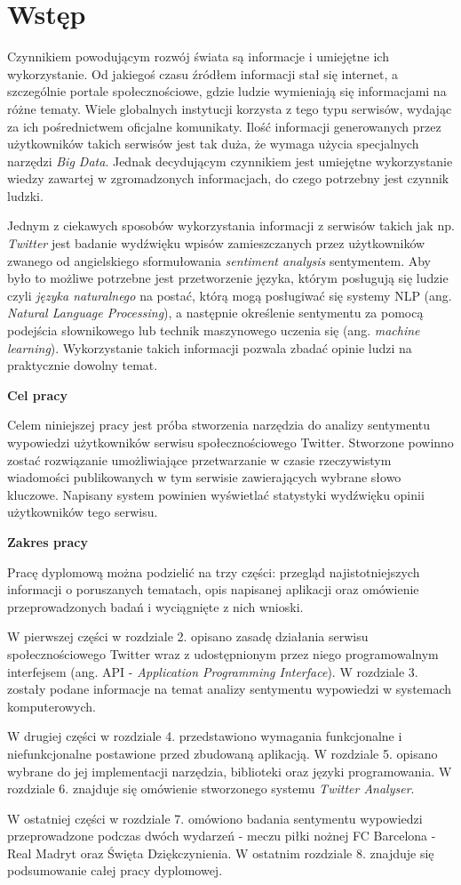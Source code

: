 \chapter{Wstęp}
\qquad Czynnikiem powodującym rozwój świata są informacje i umiejętne ich wykorzystanie. Od jakiegoś czasu źródłem informacji stał się internet, a szczególnie portale społecznościowe, gdzie ludzie wymieniają się informacjami na różne tematy. Wiele globalnych instytucji korzysta z tego typu serwisów, wydając za ich pośrednictwem oficjalne komunikaty. Ilość informacji generowanych przez użytkowników takich serwisów jest tak duża, że wymaga użycia specjalnych narzędzi \textit{Big Data}. Jednak decydującym czynnikiem jest umiejętne wykorzystanie wiedzy zawartej w zgromadzonych informacjach, do czego potrzebny jest czynnik ludzki.

Jednym z ciekawych sposobów wykorzystania informacji z serwisów takich jak np. \textit{Twitter} jest badanie wydźwięku wpisów zamieszczanych przez użytkowników zwanego od angielskiego sformułowania \textit{sentiment analysis} sentymentem. Aby było to możliwe potrzebne jest przetworzenie języka, którym posługują się ludzie czyli \textit{języka naturalnego} na postać, którą mogą posługiwać się systemy NLP (ang. \textit{Natural Language Processing}), a następnie określenie sentymentu za pomocą podejścia słownikowego lub technik maszynowego uczenia się (ang. \textit{machine learning}). Wykorzystanie takich informacji pozwala zbadać opinie ludzi na praktycznie dowolny temat.

\textbf{Cel pracy}

Celem niniejszej pracy jest próba stworzenia narzędzia do analizy sentymentu wypowiedzi użytkowników serwisu społecznościowego Twitter. Stworzone powinno zostać rozwiązanie umożliwiające przetwarzanie w czasie rzeczywistym wiadomości publikowanych w tym serwisie zawierających wybrane słowo kluczowe. Napisany system powinien wyświetlać statystyki wydźwięku opinii użytkowników tego serwisu.

\textbf{Zakres pracy}

Pracę dyplomową można podzielić na trzy części: przegląd najistotniejszych informacji o poruszanych tematach, opis napisanej aplikacji oraz omówienie przeprowadzonych badań i wyciągnięte z nich wnioski.

W pierwszej części w rozdziale 2. opisano zasadę działania serwisu społecznościowego Twitter wraz z udostępnionym przez niego programowalnym interfejsem (ang. API - \textit{Application Programming Interface}). W rozdziale 3. zostały podane informacje na temat analizy sentymentu wypowiedzi w systemach komputerowych. 

W drugiej części w rozdziale 4. przedstawiono wymagania funkcjonalne i niefunkcjonalne postawione przed zbudowaną aplikacją. W rozdziale 5. opisano wybrane do jej implementacji narzędzia, biblioteki oraz języki programowania. W rozdziale 6. znajduje się omówienie stworzonego systemu \textit{Twitter Analyser}.

W ostatniej części w rozdziale 7. omówiono badania sentymentu wypowiedzi przeprowadzone podczas dwóch wydarzeń - meczu piłki nożnej FC Barcelona - Real Madryt oraz Święta Dziękczynienia. W ostatnim rozdziale 8. znajduje się podsumowanie całej pracy dyplomowej.